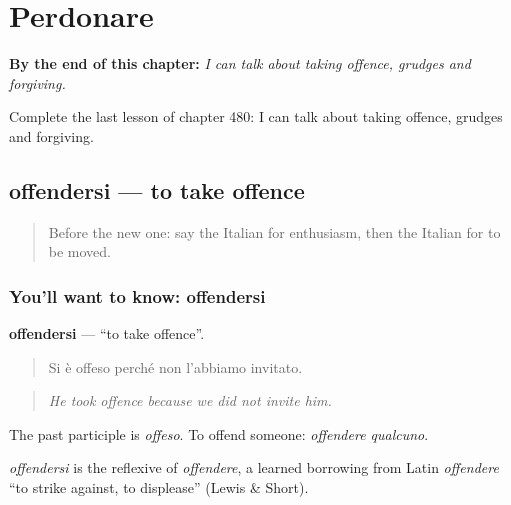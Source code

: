 
\chapter{Perdonare}
\label{ch:it-perdonare}

\begin{chapteropening}
\textbf{By the end of this chapter:} \emph{I can talk about taking offence, grudges and forgiving.}

Complete the last lesson of chapter 480: I can talk about taking offence, grudges and forgiving.
\end{chapteropening}

\section[offendersi]{offendersi — to take offence}

\label{lesson:IT-C480-offendersi}



\begin{quote}
Before the new one: say the Italian for enthusiasm, then the Italian for to be moved.
\end{quote}

\subsection*{You'll want to know: offendersi}
\textbf{offendersi} — \textquotedblleft{}to take offence\textquotedblright{}.

\begin{quote}
Si è offeso perché non l'abbiamo invitato.
\end{quote}

\begin{quote}
\emph{He took offence because we did not invite him.}
\end{quote}

The past participle is \emph{offeso}. To offend someone: \emph{offendere qualcuno}.

\begin{cousinweb}
\emph{offendersi} is the reflexive of \emph{offendere}, a learned borrowing from Latin \emph{offendere} \textquotedblleft{}to strike against, to displease\textquotedblright{} (Lewis \& Short).
\end{cousinweb}

